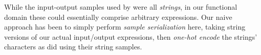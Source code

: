 \documentclass{article} %
\begin{document}


    While the input-output samples used by \citet{nsps} were all \emph{strings},
    in our functional domain these could essentially comprise arbitrary expressions.
    Our naive approach has been to simply perform \emph{sample serialization} here,
    taking string versions of our actual input/output expressions,
    then \emph{one-hot encode} the strings' characters as \citet{nsps} did using their string samples.


\end{document}
